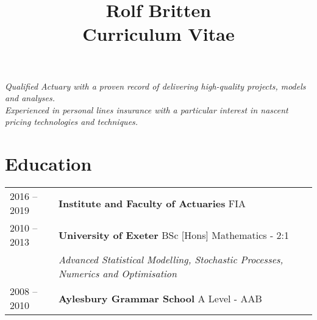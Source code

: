 \documentclass[11pt]{article}
\title{\bfseries \Huge Rolf Britten \\ \Large Curriculum Vitae}
\date{}
\begin{document}
\vspace{-20mm}
\maketitle
\vspace{-20mm}

\begin{center} \emph{Qualified Actuary with a proven record of delivering high-quality projects, models and analyses.\\Experienced in personal lines insurance with a particular interest in nascent pricing technologies and techniques.} \end{center}

\section*{Education}
\begin{tabular}{l | l l}
2016 -- 2019 & \textbf{Institute and Faculty of Actuaries} FIA \\
2010 -- 2013 & \textbf{University of Exeter} BSc [Hons] Mathematics - 2:1\\
& \hspace{4mm} \textit{Advanced Statistical Modelling, Stochastic Processes, Numerics and Optimisation }\\
2008 -- 2010 & \textbf{Aylesbury Grammar School} A Level - AAB \\
\end{tabular}
\end{document}
